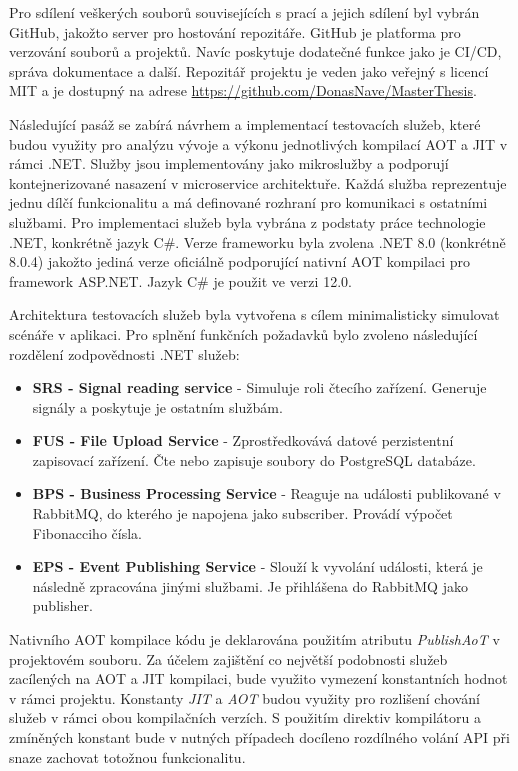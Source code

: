 Pro sdílení veškerých souborů souvisejících s prací a jejich sdílení byl vybrán GitHub, jakožto server pro hostování repozitáře. GitHub je platforma pro verzování souborů a projektů. Navíc poskytuje dodatečné funkce jako je CI/CD, správa dokumentace a další. Repozitář projektu je veden jako veřejný s licencí MIT a je dostupný na adrese \url{https://github.com/DonasNave/MasterThesis}.


Následující pasáž se zabírá návrhem a implementací testovacích služeb, které budou využity pro analýzu vývoje a výkonu jednotlivých kompilací AOT a JIT v rámci .NET. Služby jsou implementovány jako mikroslužby a podporují kontejnerizované nasazení v microservice architektuře. Každá služba reprezentuje jednu dílčí funkcionalitu a má definované rozhraní pro komunikaci s ostatními službami. Pro implementaci služeb byla vybrána z podstaty práce technologie .NET, konkrétně jazyk C\#. Verze frameworku byla zvolena .NET 8.0 (konkrétně 8.0.4) jakožto jediná verze oficiálně podporující nativní AOT kompilaci pro framework ASP.NET. Jazyk C\# je použit ve verzi 12.0.


Architektura testovacích služeb byla vytvořena s cílem minimalisticky simulovat scénáře v aplikaci. Pro splnění funkčních požadavků bylo zvoleno následující rozdělení zodpovědnosti .NET služeb:

\begin{itemize}
    \item \textbf{SRS - Signal reading service} - Simuluje roli čtecího zařízení. Generuje signály a poskytuje je ostatním službám.
    \item \textbf{FUS - File Upload Service} - Zprostředkovává datové perzistentní zapisovací zařízení. Čte nebo zapisuje soubory do PostgreSQL databáze.
    \item \textbf{BPS - Business Processing Service} - Reaguje na události publikované v RabbitMQ, do kterého je napojena jako subscriber. Provádí výpočet Fibonacciho čísla.
    \item \textbf{EPS - Event Publishing Service} - Slouží k vyvolání události, která je následně zpracována jinými službami. Je přihlášena do RabbitMQ jako publisher.
\end{itemize}

Nativního AOT kompilace kódu je deklarována použitím atributu \emph{PublishAoT} v projektovém souboru. Za účelem zajištění co největší podobnosti služeb zacílených na AOT a JIT kompilaci, bude využito vymezení konstantních hodnot v rámci projektu. Konstanty \emph{JIT} a \emph{AOT} budou využity pro rozlišení chování služeb v rámci obou kompilačních verzích. S použitím direktiv kompilátoru a zmíněných konstant bude v nutných případech docíleno rozdílného volání API při snaze zachovat totožnou funkcionalitu.

